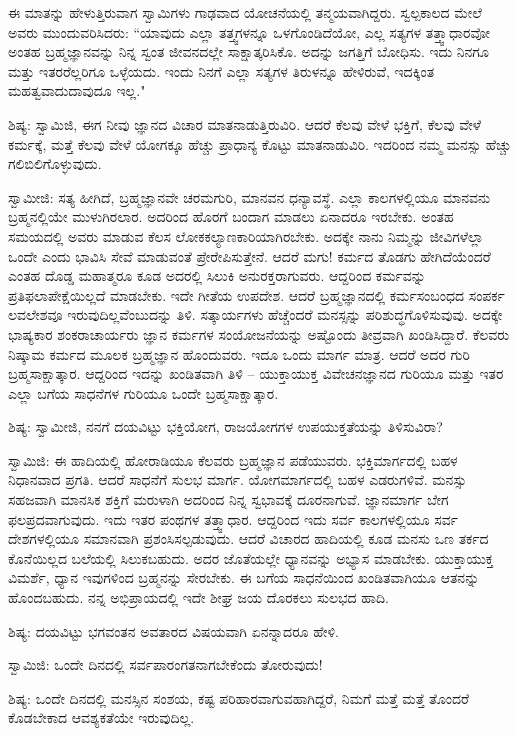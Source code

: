 ಈ ಮಾತನ್ನು ಹೇಳುತ್ತಿರುವಾಗ ಸ್ವಾಮಿಗಳು ಗಾಢವಾದ ಯೋಚನೆಯಲ್ಲಿ ತನ್ಮಯವಾಗಿದ್ದರು. ಸ್ವಲ್ಪಕಾಲದ ಮೇಲೆ ಅವರು ಮುಂದುವರಿಸಿದರು: “ಯಾವುದು ಎಲ್ಲಾ ತತ್ತ್ವಗಳನ್ನೂ ಒಳಗೊಂಡಿದೆಯೋ, ಎಲ್ಲ ಸತ್ಯಗಳ ತತ್ತ್ವಾಧಾರವೋ ಅಂತಹ ಬ್ರಹ್ಮಜ್ಞಾನವನ್ನು ನಿನ್ನ ಸ್ವಂತ ಜೀವನದಲ್ಲೇ ಸಾಕ್ಷಾತ್ಕರಿಸಿಕೊ. ಅದನ್ನು ಜಗತ್ತಿಗೆ ಬೋಧಿಸು. ಇದು ನಿನಗೂ ಮತ್ತು ಇತರರೆಲ್ಲರಿಗೂ ಒಳ್ಳೆಯದು. ಇಂದು ನಿನಗೆ ಎಲ್ಲಾ ಸತ್ಯಗಳ ತಿರುಳನ್ನೂ ಹೇಳಿರುವೆ, ಇದಕ್ಕಿಂತ ಮಹತ್ವವಾದುದಾವುದೂ ಇಲ್ಲ."

ಶಿಷ್ಯ: ಸ್ವಾಮಿಜಿ, ಈಗ ನೀವು ಜ್ಞಾನದ ವಿಚಾರ ಮಾತನಾಡುತ್ತಿರುವಿರಿ. ಆದರೆ ಕೆಲವು ವೇಳೆ ಭಕ್ತಿಗೆ, ಕೆಲವು ವೇಳೆ ಕರ್ಮಕ್ಕೆ, ಮತ್ತೆ ಕೆಲವು ವೇಳೆ ಯೋಗಕ್ಕೂ ಹೆಚ್ಚು ಪ್ರಾಧಾನ್ಯ ಕೊಟ್ಟು ಮಾತನಾಡುವಿರಿ. ಇದರಿಂದ ನಮ್ಮ ಮನಸ್ಸು ಹೆಚ್ಚು ಗಲಿಬಿಲಿಗೊಳ್ಳುವುದು.

ಸ್ವಾಮೀಜಿ: ಸತ್ಯ ಹೀಗಿದೆ, ಬ್ರಹ್ಮಜ್ಞಾನವೇ ಚರಮಗುರಿ, ಮಾನವನ ಧನ್ಯಾವಸ್ಥೆ. ಎಲ್ಲಾ ಕಾಲಗಳಲ್ಲಿಯೂ ಮಾನವನು ಬ್ರಹ್ಮನಲ್ಲಿಯೇ ಮುಳುಗಿರಲಾರ. ಅದರಿಂದ ಹೊರಗೆ ಬಂದಾಗ ಮಾಡಲು ಏನಾದರೂ ಇರಬೇಕು. ಅಂತಹ ಸಮಯದಲ್ಲಿ ಅವರು ಮಾಡುವ ಕೆಲಸ ಲೋಕಕಲ್ಯಾಣಕಾರಿಯಾಗಿರಬೇಕು. ಅದಕ್ಕೇ ನಾನು ನಿಮ್ಮನ್ನು ಜೀವಿಗಳೆಲ್ಲಾ ಒಂದೇ ಎಂದು ಭಾವಿಸಿ ಸೇವೆ ಮಾಡುವಂತೆ ಪ್ರೇರೇಪಿಸುತ್ತೇನೆ. ಆದರೆ ಮಗು! ಕರ್ಮದ ತೊಡಗು ಹೇಗಿದೆಯೆಂದರೆ ಎಂತಹ ದೊಡ್ಡ ಮಹಾತ್ಮರೂ ಕೂಡ ಅದರಲ್ಲಿ ಸಿಲುಕಿ ಅನುರಕ್ತರಾಗುವರು. ಆದ್ದರಿಂದ ಕರ್ಮವನ್ನು ಪ್ರತಿಫಲಾಪೇಕ್ಷೆಯಿಲ್ಲದೆ ಮಾಡಬೇಕು. ಇದೇ ಗೀತೆಯ ಉಪದೇಶ. ಆದರೆ ಬ್ರಹ್ಮಜ್ಞಾನದಲ್ಲಿ ಕರ್ಮಸಂಬಂಧದ ಸಂಪರ್ಕ ಲವಲೇಶವೂ ಇರುವುದಿಲ್ಲವೆಂಬುದನ್ನು ತಿಳಿ. ಸತ್ಕಾರ್ಯಗಳು ಹೆಚ್ಚೆಂದರೆ ಮನಸ್ಸನ್ನು ಪರಿಶುದ್ಧಗೊಳಿಸುವುವು. ಅದಕ್ಕೇ ಭಾಷ್ಯಕಾರ ಶಂಕರಾಚಾರ್ಯರು ಜ್ಞಾನ ಕರ್ಮಗಳ ಸಂಯೋಜನೆಯನ್ನು ಅಷ್ಟೊಂದು ತೀವ್ರವಾಗಿ ಖಂಡಿಸಿದ್ದಾರೆ. ಕೆಲವರು ನಿಷ್ಕಾಮ ಕರ್ಮದ ಮೂಲಕ ಬ್ರಹ್ಮಜ್ಞಾನ ಹೊಂದುವರು. ಇದೂ ಒಂದು ಮಾರ್ಗ ಮಾತ್ರ. ಆದರೆ ಅದರ ಗುರಿ ಬ್ರಹ್ಮಸಾಕ್ಷಾತ್ಕಾರ. ಆದ್ದರಿಂದ ಇದನ್ನು ಖಂಡಿತವಾಗಿ ತಿಳಿ – ಯುಕ್ತಾಯುಕ್ತ ವಿವೇಚನಜ್ಞಾನದ ಗುರಿಯೂ ಮತ್ತು ಇತರ ಎಲ್ಲಾ ಬಗೆಯ ಸಾಧನೆಗಳ ಗುರಿಯೂ ಒಂದೇ ಬ್ರಹ್ಮಸಾಕ್ಷಾತ್ಕಾರ.

ಶಿಷ್ಯ: ಸ್ವಾಮೀಜಿ, ನನಗೆ ದಯವಿಟ್ಟು ಭಕ್ತಿಯೋಗ, ರಾಜಯೋಗಗಳ ಉಪಯುಕ್ತತೆಯನ್ನು ತಿಳಿಸುವಿರಾ?

ಸ್ವಾಮಿಜಿ: ಈ ಹಾದಿಯಲ್ಲಿ ಹೋರಾಡಿಯೂ ಕೆಲವರು ಬ್ರಹ್ಮಜ್ಞಾನ ಪಡೆಯುವರು. ಭಕ್ತಿಮಾರ್ಗದಲ್ಲಿ ಬಹಳ ನಿಧಾನವಾದ ಪ್ರಗತಿ. ಆದರೆ ಸಾಧನೆಗೆ ಸುಲಭ ಮಾರ್ಗ. ಯೋಗಮಾರ್ಗದಲ್ಲಿ ಬಹಳ ಎಡರುಗಳಿವೆ. ಮನಸ್ಸು ಸಹಜವಾಗಿ ಮಾನಸಿಕ ಶಕ್ತಿಗೆ ಮರುಳಾಗಿ ಅದರಿಂದ ನಿನ್ನ ಸ್ವಭಾವಕ್ಕೆ ದೂರನಾಗುವೆ. ಜ್ಞಾನಮಾರ್ಗ ಬೇಗ ಫಲಪ್ರದವಾಗುವುದು. ಇದು ಇತರ ಪಂಥಗಳ ತತ್ತ್ವಾಧಾರ. ಆದ್ದರಿಂದ ಇದು ಸರ್ವ ಕಾಲಗಳಲ್ಲಿಯೂ ಸರ್ವ ದೇಶಗಳಲ್ಲಿಯೂ ಸಮಾನವಾಗಿ ಪ್ರಶಂಸಿಸಲ್ಪಡುವುದು. ಆದರೆ ವಿಚಾರದ ಹಾದಿಯಲ್ಲಿ ಕೂಡ ಮನಸು ಒಣ ತರ್ಕದ ಕೊನೆಯಿಲ್ಲದ ಬಲೆಯಲ್ಲಿ ಸಿಲುಕಬಹುದು. ಅದರ ಜೊತೆಯಲ್ಲೇ ಧ್ಯಾನವನ್ನು ಅಭ್ಯಾಸ ಮಾಡಬೇಕು. ಯುಕ್ತಾಯುಕ್ತ ವಿಮರ್ಶೆ, ಧ್ಯಾನ ಇವುಗಳಿಂದ ಬ್ರಹ್ಮನನ್ನು ಸೇರಬೇಕು. ಈ ಬಗೆಯ ಸಾಧನೆಯಿಂದ ಖಂಡಿತವಾಗಿಯೂ ಆತನನ್ನು ಹೊಂದಬಹುದು. ನನ್ನ ಅಭಿಪ್ರಾಯದಲ್ಲಿ ಇದೇ ಶೀಘ್ರ ಜಯ ದೊರಕಲು ಸುಲಭದ ಹಾದಿ.

ಶಿಷ್ಯ: ದಯವಿಟ್ಟು ಭಗವಂತನ ಅವತಾರದ ವಿಷಯವಾಗಿ ಏನನ್ನಾದರೂ ಹೇಳಿ.

ಸ್ವಾಮಿಜಿ: ಒಂದೇ ದಿನದಲ್ಲಿ ಸರ್ವಪಾರಂಗತನಾಗಬೇಕೆಂದು ತೋರುವುದು!

ಶಿಷ್ಯ: ಒಂದೇ ದಿನದಲ್ಲಿ ಮನಸ್ಸಿನ ಸಂಶಯ, ಕಷ್ಟ ಪರಿಹಾರವಾಗುವಹಾಗಿದ್ದರೆ, ನಿಮಗೆ ಮತ್ತೆ ಮತ್ತೆ ತೊಂದರೆ ಕೊಡಬೇಕಾದ ಆವಶ್ಯಕತೆಯೇ ಇರುವುದಿಲ್ಲ.

